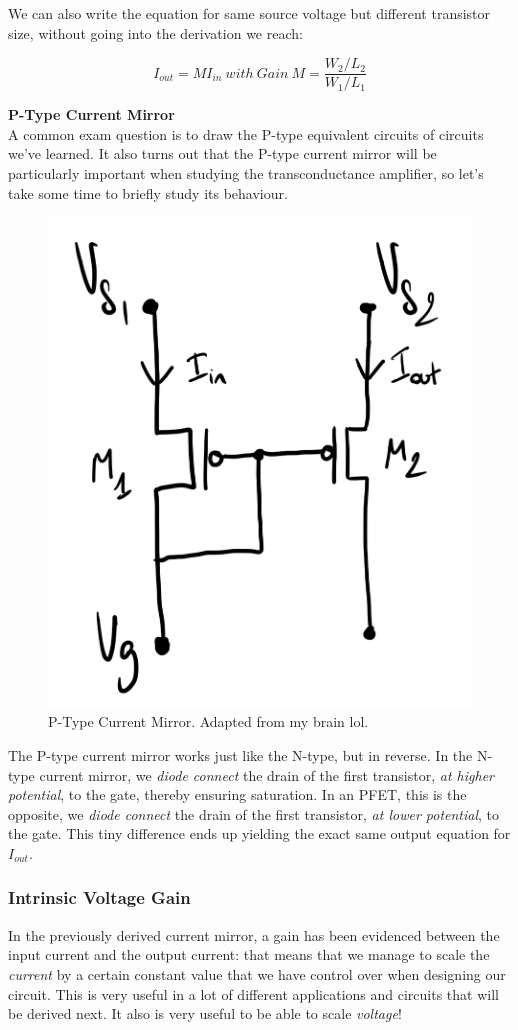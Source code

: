 We can also write the equation for same source voltage but different transistor size, without going into the derivation we reach: 

\begin{equation}
I_{out} = M I_{in} \ with \ Gain \ M = \frac{W_2/L_2}{W_1/L_1}
\end{equation}

\newline \newline
\textbf{P-Type Current Mirror} \\

A common exam question is to draw the P-type equivalent circuits of circuits we've learned. It also turns out that the P-type current mirror will be particularly important when studying the transconductance amplifier, so let's take some time to briefly study its behaviour.   

\begin{figure}[H]
    \centering
    \includegraphics[width=0.3\linewidth]{../../Figures/Ptype_Current_Mirror.jpg}
    \caption{P-Type Current Mirror. Adapted from my brain lol.}
    \label{fig:N-Type Current Mirror}   
\end{figure}

The P-type current mirror works just like the N-type, but in reverse. In the N-type current mirror, we \textit{diode connect} the drain of the first transistor, \textit{at higher potential}, to the gate, thereby ensuring saturation. In an PFET, this is the opposite, we \textit{diode connect} the drain of the first transistor, \textit{at lower potential}, to the gate. This tiny difference ends up yielding the exact same output equation for $I_{out}$. 

\subsubsection{Intrinsic Voltage Gain}

In the previously derived current mirror, a gain has been evidenced between the input current and the output current: that means that we manage to scale the \textit{current} by a certain constant value that we have control over when designing our circuit. This is very useful in a lot of different applications and circuits that will be derived next. It also is very useful to be able to scale \textit{voltage}!

